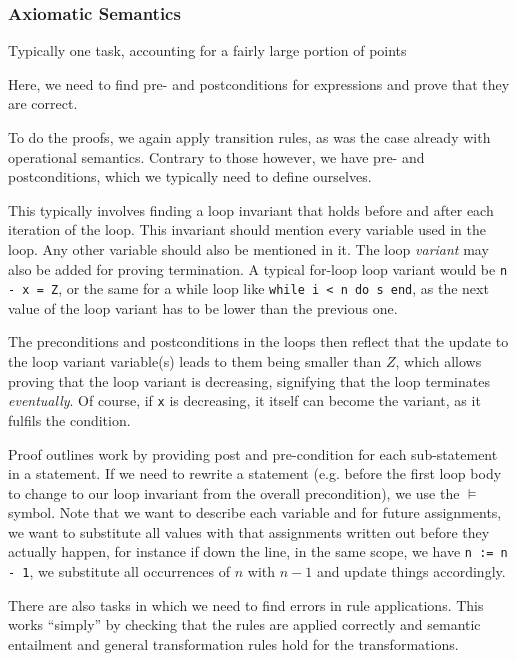 \subsubsection{Axiomatic Semantics}
\begin{examdetails}
    Typically one task, accounting for a fairly large portion of points
\end{examdetails}
Here, we need to find pre- and postconditions for expressions and prove that they are correct.

To do the proofs, we again apply transition rules, as was the case already with operational semantics.
Contrary to those however, we have pre- and postconditions, which we typically need to define ourselves.

This typically involves finding a loop invariant that holds before and after each iteration of the loop.
This invariant should mention every variable used in the loop.
Any other variable should also be mentioned in it. The loop \textit{variant} may also be added for proving termination.
A typical for-loop loop variant would be \texttt{n - x = Z}, or the same for a while loop like \texttt{while i < n do s end},
as the next value of the loop variant has to be lower than the previous one.

The preconditions and postconditions in the loops then reflect that the update to the loop variant variable(s) leads to them being smaller than $Z$,
which allows proving that the loop variant is decreasing, signifying that the loop terminates \textit{eventually}.
Of course, if \texttt{x} is decreasing, it itself can become the variant, as it fulfils the condition.

Proof outlines work by providing post and pre-condition for each sub-statement in a statement.
If we need to rewrite a statement (e.g. before the first loop body to change to our loop invariant from the overall precondition),
we use the $\models$ symbol.
Note that we want to describe each variable and for future assignments, we want to substitute all values with that assignments written out before
they actually happen, for instance if down the line, in the same scope, we have \texttt{n := n - 1}, we substitute all occurrences of $n$ with $n - 1$ and update things accordingly.

There are also tasks in which we need to find errors in rule applications. This works ``simply'' by checking that the rules are applied correctly
and semantic entailment and general transformation rules hold for the transformations.
